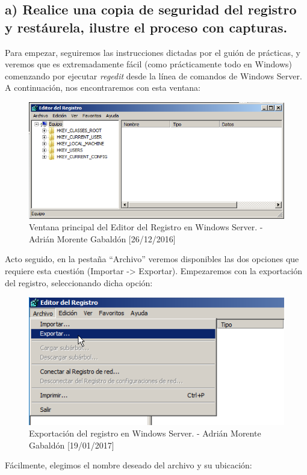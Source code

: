 	\subsection{a) Realice una copia de seguridad del registro y restáurela, ilustre el proceso con capturas.}
	Para empezar, seguiremos las instrucciones dictadas por el guión de prácticas, y veremos que es extremadamente fácil (como prácticamente todo en Windows) 	comenzando por ejecutar \emph{regedit}	desde la línea de comandos de Windows Server. A continuación, nos encontraremos con esta ventana:
	\begin{figure}[H]
		\centering
		\includegraphics[scale=0.7]{regedit}
		\caption{Ventana principal del Editor del Registro en Windows Server. - Adrián Morente Gabaldón [26/12/2016]}
		\label{figura4}
	\end{figure}
	Acto seguido, en la pestaña ``Archivo'' veremos disponibles las dos opciones que requiere esta cuestión (Importar -> Exportar). Empezaremos con la exportación del registro, seleccionando dicha opción:
	\begin{figure}[H]
		\centering
		\includegraphics[scale=0.8]{regedit-exportar}
		\caption{Exportación del registro en Windows Server. - Adrián Morente Gabaldón [19/01/2017]}
		\label{figura7}
	\end{figure}
	Fácilmente, elegimos el nombre deseado del archivo y su ubicación:
